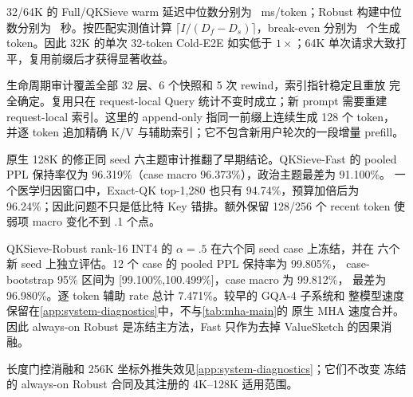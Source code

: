 32/64K 的 Full/QKSieve warm 延迟中位数分别为
\QKSievePersistentWarmLatencyText\ ms/token；Robust 构建中位数分别为
\QKSievePersistentBuildText\ 秒。按匹配实测值计算
$\lceil I/(D_f-D_s)\rceil$，break-even 分别为
\QKSievePersistentBreakEvenText\ 个生成 token。因此 32K 的单次 32-token
Cold-E2E 如实低于 $1\times$；64K 单次请求大致打平，复用前缀后才获得显著收益。

生命周期审计覆盖全部 32 层、6 个快照和 5 次 rewind，索引指针稳定且重放
完全确定。复用只在 request-local Query 统计不变时成立；新 prompt 需要重建
request-local 索引。这里的 append-only 指同一前缀上连续生成 128 个 token，
并逐 token 追加精确 K/V 与辅助索引；它不包含新用户轮次的一段增量 prefill。


原生 128K 的修正同 seed 六主题审计推翻了早期结论。QKSieve-Fast 的 pooled
PPL 保持率仅为 96.319\%（case macro 96.373\%），政治主题最差为 91.100\%。
一个医学归因窗口中，Exact-QK top-1,280 也只有 94.74\%，预算加倍后为
96.24\%；因此问题不只是低比特 Key 错排。额外保留 128/256 个 recent token
使弱项 macro 变化不到 .1 个点。

QKSieve-Robust rank-16 INT4 的 $\alpha=.5$ 在六个同 seed case 上冻结，并在
六个新 seed 上独立评估。12 个 case 的 pooled PPL 保持率为 99.805\%，
case-bootstrap 95\% 区间为 [99.100\%,100.499\%]，case macro 为 99.812\%，
最差为 96.980\%。逐 token 辅助 rate 总计 7.471\%。较早的 GQA-4 子系统和
整模型速度保留在\cref{app:system-diagnostics}中，不与\cref{tab:mha-main}的
原生 MHA 速度合并。因此 always-on Robust 是冻结主方法，Fast 只作为去掉
ValueSketch 的因果消融。

长度门控消融和 256K 坐标外推失效见\cref{app:system-diagnostics}；它们不改变
冻结的 always-on Robust 合同及其注册的 4K--128K 适用范围。
